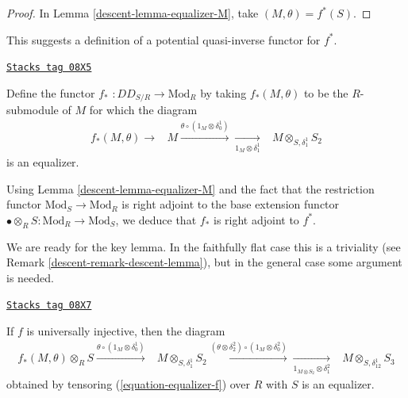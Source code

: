\begin{proof}

In Lemma \ref{descent-lemma-equalizer-M}, take $(M, \theta) = f^*(S)$.
\end{proof}

This suggests a definition of a potential quasi-inverse functor for $f^*$.

\begin{definition}[Pushforward]
\label{descent-definition-pushforward}
\href{https://stacks.math.columbia.edu/tag/08X5}{\texttt{Stacks tag 08X5}}

Define the functor {\it $f_*$} $: DD_{S/R} \to \text{Mod}_R$ by taking
$f_*(M, \theta)$ to be the $R$-submodule of $M$ for which the diagram
\begin{equation}
\label{equation-equalizer-f}
\begin{array}{ccc}f_*(M,\theta) \longrightarrow & M \overset{\theta \circ (1_M \otimes
\delta_0^1)}{\longrightarrow}\underset{1_M \otimes \delta_1^1}{\longrightarrow} & M \otimes_{S, \delta_1^1} S_2\end{array}
\end{equation}
is an equalizer.
\end{definition}

Using Lemma \ref{descent-lemma-equalizer-M} and the fact that the restriction functor
$\text{Mod}_S \to \text{Mod}_R$ is right adjoint to the base extension
functor $\bullet \otimes_R S: \text{Mod}_R \to \text{Mod}_S$,
we deduce that $f_*$ is right adjoint to $f^*$.

\medskip\noindent
We are ready for the key lemma. In the faithfully flat case this is a
triviality (see Remark \ref{descent-remark-descent-lemma}),
but in the general case some argument is needed.

\begin{lemma}
\label{descent-lemma-descent-lemma}
\href{https://stacks.math.columbia.edu/tag/08X7}{\texttt{Stacks tag 08X7}}

If $f$ is universally injective, then the diagram
\begin{equation}
\label{equation-equalizer-f2}
\begin{array}{ccc}f_*(M, \theta) \otimes_R S
\overset{\theta \circ (1_M \otimes \delta_0^1)}{\longrightarrow} & M \otimes_{S, \delta_1^1} S_2
\overset{(\theta \otimes \delta_2^2) \circ (1_M \otimes \delta^2_0)}{\longrightarrow}\underset{1_{M \otimes S_2} \otimes \delta^2_1}{\longrightarrow} & M \otimes_{S, \delta_{12}^1} S_3\end{array}
\end{equation}
obtained by tensoring (\ref{equation-equalizer-f}) over $R$ with $S$ is an
equalizer.
\end{lemma}

